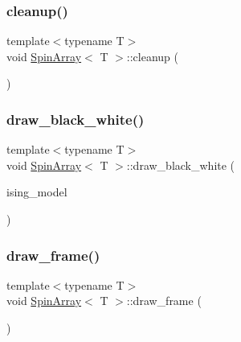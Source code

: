 \subsubsection{\texorpdfstring{cleanup()}{cleanup()}}
{\footnotesize\ttfamily template$<$typename T$>$ \\
void \mbox{\hyperlink{classSpinArray}{Spin\+Array}}$<$ T $>$\+::cleanup (\begin{DoxyParamCaption}{ }\end{DoxyParamCaption})\hspace{0.3cm}{\ttfamily [inline]}}

\mbox{\label{classSpinArray_ab1347f20a673884e1289e4895889a17c}} 
\subsubsection{\texorpdfstring{draw\+\_\+black\+\_\+white()}{draw\_black\_white()}}
{\footnotesize\ttfamily template$<$typename T$>$ \\
void \mbox{\hyperlink{classSpinArray}{Spin\+Array}}$<$ T $>$\+::draw\+\_\+black\+\_\+white (\begin{DoxyParamCaption}\item[{\mbox{\hyperlink{classIsingModel}{Ising\+Model}}$<$ T $>$ \&}]{ising\+\_\+model }\end{DoxyParamCaption})\hspace{0.3cm}{\ttfamily [inline]}}

\mbox{\label{classSpinArray_a0f8e083d6f61a3ebbb5aec9cae749af7}} 
\subsubsection{\texorpdfstring{draw\+\_\+frame()}{draw\_frame()}}
{\footnotesize\ttfamily template$<$typename T$>$ \\
void \mbox{\hyperlink{classSpinArray}{Spin\+Array}}$<$ T $>$\+::draw\+\_\+frame (\begin{DoxyParamCaption}{ }\end{DoxyParamCaption})\hspace{0.3cm}{\ttfamily [inline]}}

